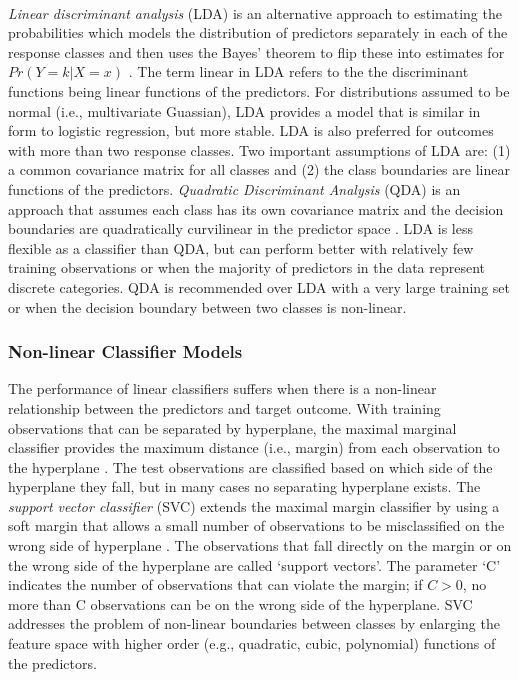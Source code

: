 \\\documentclass[sigconf]{acmart}
\begin{document}
\emph{Linear discriminant analysis} (LDA) is an alternative approach to 
estimating the probabilities which models the distribution of predictors 
separately in each of the response classes and then uses the Bayes' theorem 
to flip these into estimates for $Pr(Y=k | X=x)$ \cite{james13}. The term 
linear in LDA refers to the the discriminant functions being linear functions 
of the predictors. For distributions assumed to be normal (i.e., multivariate 
Guassian), LDA provides a model that is similar in form to logistic regression, 
but more stable. LDA is also preferred for outcomes with more than two response 
classes. Two important assumptions of LDA are: (1) a common covariance matrix 
for all classes and (2) the class boundaries are linear functions of the 
predictors. \emph{Quadratic Discriminant Analysis} (QDA) is an approach that 
assumes each class has its own covariance matrix and the decision boundaries 
are quadratically curvilinear in the predictor space \cite{kuhn13}. LDA is less 
flexible as a classifier than QDA, but can perform better with relatively few 
training observations or when the majority of predictors in the data represent 
discrete categories. QDA is recommended over LDA with a very large training 
set or when the decision boundary between two classes is non-linear. 


\subsubsection{Non-linear Classifier Models}

The performance of linear classifiers suffers when there is a non-linear 
relationship between the predictors and target outcome. With training
observations that can be separated by hyperplane, the maximal marginal 
classifier provides the maximum distance (i.e., margin) from each observation
to the hyperplane \cite{james13}. The test observations are classified based 
on which side of the hyperplane they fall, but in many cases no separating 
hyperplane exists. The \emph{support vector classifier} (SVC) extends the 
maximal margin classifier by using a soft margin that allows a small number 
of observations to be misclassified on the wrong side of hyperplane 
\cite{kuhn13, cortes95}. The observations that fall directly on the margin or 
on the wrong side of the hyperplane are called `support vectors'. The parameter 
`C' indicates the number of observations that can violate the margin; if $C>0$, 
no more than C observations can be on the wrong side of the hyperplane. 
SVC addresses the problem of non-linear boundaries between classes by 
enlarging the feature space with higher order (e.g., quadratic, cubic, 
polynomial) functions of the predictors. 
\end{document}
